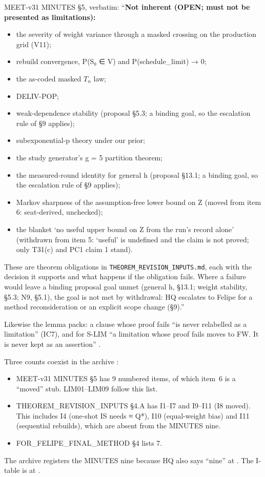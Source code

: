 \begin{agentnote}
MEET-v31 MINUTES §5, verbatim: ``\textbf{Not inherent (OPEN; must not be presented as limitations):}
\begin{itemize}
\item the severity of weight variance through a masked crossing on the production grid (V11);
\item rebuild convergence, P(S₀ ∈ V) and P(schedule\_limit) → 0;
\item the as-coded masked $T_n$ law;
\item DELIV-POP;
\item weak-dependence stability (proposal §5.3; a binding goal, so the escalation rule of §9 applies);
\item subexponential-p theory under our prior;
\item the study generator's g = 5 partition theorem;
\item the measured-round identity for general h (proposal §13.1; a binding goal, so the escalation rule of §9 applies);
\item Markov sharpness of the assumption-free lower bound on Z (moved from item 6: seat-derived, unchecked);
\item the blanket `no useful upper bound on Z from the run's record alone' (withdrawn from item 5: `useful' is undefined and the claim is not proved; only T31(c) and PC1 claim 1 stand).
\end{itemize}
These are theorem obligations in \texttt{THEOREM\_REVISION\_INPUTS.md}, each with the decision it supports and what happens if the obligation fails. Where a failure would leave a binding proposal goal unmet (general h, §13.1; weight stability, §5.3; N9, §5.1), the goal is not met by withdrawal: HQ escalates to Felipe for a method reconsideration or an explicit scope change (§9).'' 

Likewise the lemma packs: a clause whose proof fails ``is never relabelled as a limitation'' (IC7), and for S-LIM ``a limitation whose proof fails moves to FW. It is never kept as an assertion'' .
\end{agentnote}
\begin{uncertain}
Three counts coexist in the archive :
\begin{itemize}
\item MEET-v31 MINUTES §5 has 9 numbered items, of which item~6 is a ``moved'' stub. LIM01--LIM09 follow this list.
\item THEOREM\_REVISION\_INPUTS §4.A has I1--I7 and I9--I11 (I8 moved). This includes I4 (one-shot IS needs ≈ Q*), I10 (equal-weight bias) and I11 (sequential rebuilds), which are absent from the MINUTES nine.
\item FOR\_FELIPE\_FINAL\_METHOD §4 lists 7.
\end{itemize}
The archive registers the MINUTES nine because HQ also says ``nine'' at . The I-table is at .
\end{uncertain}

